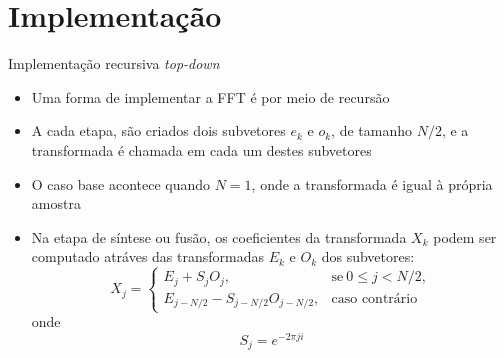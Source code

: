 \section{Implementação}

\begin{frame}[fragile]{Implementação recursiva {\it top-down}}

    \begin{itemize}
        \item Uma forma de implementar a FFT é por meio de recursão

        \item A cada etapa, são criados dois subvetores $e_k$ e $o_k$, de tamanho $N/2$, e a 
            transformada é chamada em cada um destes subvetores

        \item O caso base acontece quando $N = 1$, onde a transformada é igual à própria amostra

        \item Na etapa de síntese ou fusão, os coeficientes da transformada $X_k$ podem ser
            computado atráves das transformadas $E_k$ e $O_k$ dos subvetores:
        \[
            X_j = \left\{ \begin{array}{ll}
                E_j + S_jO_j,& \mbox{se}\ 0 \leq j < N/2,\\
                E_{j - N/2} - S_{j - N/2}O_{j - N/2},& \mbox{caso contrário}
            \end{array}\right.
        \]
        onde
        \[
            S_j = e^{-2\pi ji}
        \]
    \end{itemize}

\end{frame}


